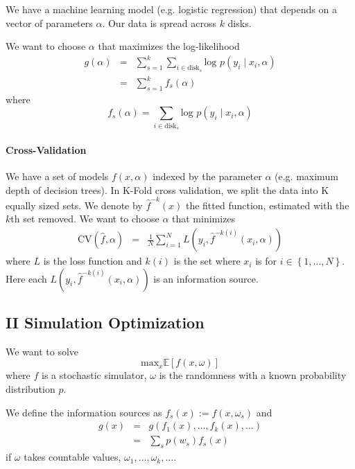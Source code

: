 \documentclass[12pt,english]{article}
\begin{document}
We have a machine learning model (e.g. logistic regression) that depends
on a vector of parameters $\alpha$. Our data is spread across $k$
disks. 

We want to choose $\alpha$ that maximizes the log-likelihood 
\begin{eqnarray*}
g\left(\alpha\right) & = & \sum_{s=1}^{k}\sum_{i\in\mbox{disk}_{s}}\mbox{log }p\left(y_{i}\mid x_{i},\alpha\right)\\
 & = & \sum_{s=1}^{k}f_{s}\left(\alpha\right)
\end{eqnarray*}
where 
\[
f_{s}\left(\alpha\right)=\sum_{i\in\mbox{disk}_{s}}\mbox{log }p\left(y_{i}\mid x_{i},\alpha\right)
\]



\paragraph*{Cross-Validation}

We have a set of models $f\left(x,\alpha\right)$ indexed by the parameter
$\alpha$ (e.g. maximum depth of decision trees). In K-Fold cross validation, we split the data into K equally
sized sets. We denote by $\hat{f}^{-k}\left(x\right)$ the fitted
function, estimated with the $k$th set removed. We want to choose
$\alpha$ that minimizes
\begin{eqnarray*}
\mbox{CV}\left(\hat{f},\alpha\right) & = & \frac{1}{N}\sum_{i=1}^{N}L\left(y_{i},\hat{f}^{-k\left(i\right)}\left(x_{i},\alpha\right)\right)
\end{eqnarray*}
where $L$ is the loss function and $k\left(i\right)$ is the set
where $x_{i}$ is for $i\in\left\{ 1,\ldots,N\right\} $. Here each
$L\left(y_{i},\hat{f}^{-k\left(i\right)}\left(x_{i},\alpha\right)\right)$
is an information source.


\subsection*{II Simulation Optimization}

We want to solve 
\[
\mbox{max}_{x}\mathbb{E}\left[f\left(x,\omega\right)\right]
\]
where $f$ is a stochastic simulator, $\omega$ is the randomness
with a known probability distribution $p$.

We define the information sources as $f_{s}\left(x\right):=f\left(x,\omega_{s}\right)$
and 
\begin{eqnarray*}
g\left(x\right) & = & g\left(f_{1}\left(x\right),\ldots,f_{k}\left(x\right),\ldots\right)\\
 & = & \sum_{s}p\left(w_{s}\right)f_{s}\left(x\right)
\end{eqnarray*}
if $\omega$ takes countable values, $\omega_{1},\ldots,\omega_{k},\ldots$. 
\end{document}
